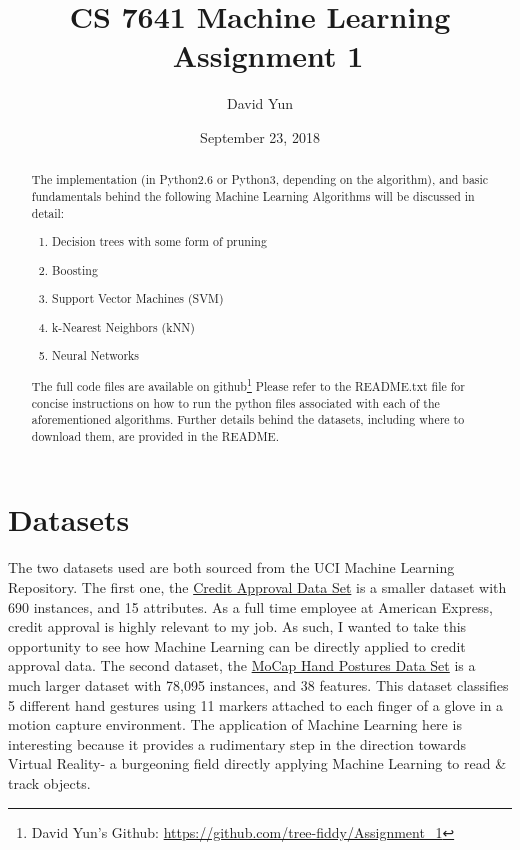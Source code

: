 \documentclass[letterpaper,12pt]{article}
\begin{document}
\title{CS 7641 Machine Learning \\
		\ Assignment 1 }
\author{David Yun}
\date{September 23, 2018}
\maketitle

\begin{abstract}
  The implementation (in Python2.6 or Python3, depending on the algorithm), and basic fundamentals behind the following Machine Learning Algorithms will be discussed in detail:  
  \begin{enumerate}
  \item Decision trees with some form of pruning
  \item Boosting
  \item Support Vector Machines (SVM)
  \item k-Nearest Neighbors (kNN)
  \item Neural Networks
  \end{enumerate}

  The full code files are available on github\footnote{David Yun's Github: \url{https://github.com/tree-fiddy/Assignment_1}}
  Please refer to the README.txt file for concise instructions on how to run the python files associated with each of the aforementioned algorithms.  Further details behind the datasets, including where to download them, are provided in the README.  

\end{abstract}

\tableofcontents

\section{Datasets}
The two datasets used are both sourced from the UCI Machine Learning Repository.  The first one, the \href{http://archive.ics.uci.edu/ml/datasets/credit+approval}{Credit Approval Data Set} is a smaller dataset with 690 instances, and 15 attributes.  As a full time employee at American Express, credit approval is highly relevant to my job.  As such, I wanted to take this opportunity to see how Machine Learning can be directly applied to credit approval data.  The second dataset, the \href{https://archive.ics.uci.edu/ml/datasets/MoCap+Hand+Postures#}{MoCap Hand Postures Data Set} is a much larger dataset with 78,095 instances, and 38 features.  This dataset classifies 5 different hand gestures using 11 markers attached to each finger of a glove in a motion capture environment.  The application of Machine Learning here is interesting because it provides a rudimentary step in the direction towards Virtual Reality- a burgeoning field directly applying Machine Learning to read \& track objects.
\end{document}
